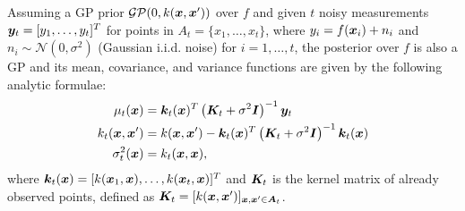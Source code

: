 Assuming a GP prior $\mathcal{GP}(0, k(\bm{x}, \bm{x}'))$ over $f$ and given
$t$ noisy measurements $\bm{y}_t = [y_1,\ldots,y_t]^T$ for
points in $A_t = \{x_1,\ldots,x_t\}$,
where $y_i = f(\bm{x}_i) + n_i$ and
${n_i \sim \mathcal{N}(0, \sigma^2)}$ (Gaussian i.i.d. noise)
for $i = 1,\ldots,t$, the posterior over $f$ is also a
GP and its mean, covariance, and variance functions are given by the
following analytic formulae:
\begin{align}
\mu_t(\bm{x}) &= \bm{k}_t(\bm{x})^T\left(\bm{K}_t + \sigma^2 \bm{I}\right)^{-1}\bm{y}_t\label{eq:mean}\\
k_t(\bm{x}, \bm{x}') &= k(\bm{x}, \bm{x}') - \bm{k}_t(\bm{x})^T\left(\bm{K}_t + \sigma^2 \bm{I}\right)^{-1}\bm{k}_t(\bm{x})\notag\\
\sigma_t^2(\bm{x}) &= k_t(\bm{x}, \bm{x})\label{eq:var},
\end{align}
where $\bm{k}_t(\bm{x}) = [k(\bm{x}_1, \bm{x}),\ldots,k(\bm{x}_t, \bm{x})]^T$ and $\bm{K}_t$ is
the kernel matrix of already observed points, defined as
${\bm{K}_t = [k(\bm{x}, \bm{x}')]_{\bm{x}, \bm{x}'\in\bm{A}_t}}$.
